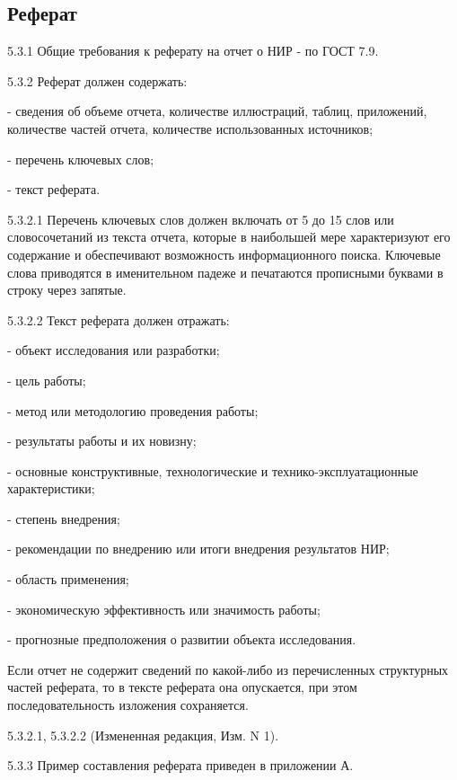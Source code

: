 \subsection*{\Large{Реферат}}
5.3.1 Общие требования к реферату на отчет о НИР - по ГОСТ 7.9.

5.3.2 Реферат должен содержать:

- сведения об объеме отчета, количестве иллюстраций, таблиц, приложений, количестве частей отчета, количестве использованных источников;

- перечень ключевых слов;

- текст реферата.

5.3.2.1 Перечень ключевых слов должен включать от 5 до 15 слов или словосочетаний из текста отчета, которые в наибольшей мере характеризуют его содержание и обеспечивают возможность информационного поиска. Ключевые слова приводятся в именительном падеже и печатаются прописными буквами в строку через запятые.

5.3.2.2 Текст реферата должен отражать:

- объект исследования или разработки;

- цель работы;

- метод или методологию проведения работы;

- результаты работы и их новизну;

- основные конструктивные, технологические и технико-эксплуатационные характеристики;

- степень внедрения;

- рекомендации по внедрению или итоги внедрения результатов НИР;

- область применения;

- экономическую эффективность или значимость работы;

- прогнозные предположения о развитии объекта исследования.

Если отчет не содержит сведений по какой-либо из перечисленных структурных частей реферата, то в тексте реферата она опускается, при этом последовательность изложения сохраняется.

5.3.2.1, 5.3.2.2 (Измененная редакция, Изм. N 1).

5.3.3 Пример составления реферата приведен в приложении А.
